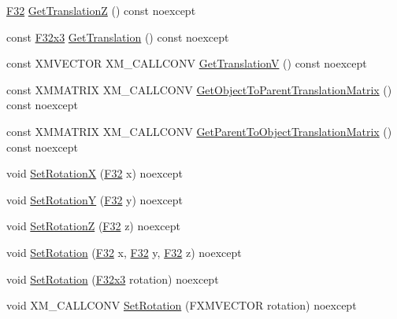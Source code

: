 \begin{DoxyCompactItemize}
\item 
\hyperlink{namespacemage_aa97e833b45f06d60a0a9c4fc22ae02c0}{F32} \hyperlink{classmage_1_1_transform_a2899159e8e953026bf8b6863c65f454f}{Get\+TranslationZ} () const noexcept
\item 
const \hyperlink{namespacemage_a73fbe0da4b8d5bc156bb8453e5b63a17}{F32x3} \hyperlink{classmage_1_1_transform_a2e41df945ad4679a4e0ca021d4f8750b}{Get\+Translation} () const noexcept
\item 
const X\+M\+V\+E\+C\+T\+OR X\+M\+\_\+\+C\+A\+L\+L\+C\+O\+NV \hyperlink{classmage_1_1_transform_a2528e3f6ee97c90966393a8dc365ec05}{Get\+TranslationV} () const noexcept
\item 
const X\+M\+M\+A\+T\+R\+IX X\+M\+\_\+\+C\+A\+L\+L\+C\+O\+NV \hyperlink{classmage_1_1_transform_adfecbcf77681da90a0d22690621936b3}{Get\+Object\+To\+Parent\+Translation\+Matrix} () const noexcept
\item 
const X\+M\+M\+A\+T\+R\+IX X\+M\+\_\+\+C\+A\+L\+L\+C\+O\+NV \hyperlink{classmage_1_1_transform_af59262c0537f9ecb6ab9af0b6dbc70d2}{Get\+Parent\+To\+Object\+Translation\+Matrix} () const noexcept
\item 
void \hyperlink{classmage_1_1_transform_ac626eec777b86b0a1fc946703c962eda}{Set\+RotationX} (\hyperlink{namespacemage_aa97e833b45f06d60a0a9c4fc22ae02c0}{F32} x) noexcept
\item 
void \hyperlink{classmage_1_1_transform_aaf2754a227e2cf416960a92f7e4c5dc7}{Set\+RotationY} (\hyperlink{namespacemage_aa97e833b45f06d60a0a9c4fc22ae02c0}{F32} y) noexcept
\item 
void \hyperlink{classmage_1_1_transform_aca5e1d7c83e91f9c36be98c4a4a2163b}{Set\+RotationZ} (\hyperlink{namespacemage_aa97e833b45f06d60a0a9c4fc22ae02c0}{F32} z) noexcept
\item 
void \hyperlink{classmage_1_1_transform_ad4c49c5298d68f3945698ba88e461145}{Set\+Rotation} (\hyperlink{namespacemage_aa97e833b45f06d60a0a9c4fc22ae02c0}{F32} x, \hyperlink{namespacemage_aa97e833b45f06d60a0a9c4fc22ae02c0}{F32} y, \hyperlink{namespacemage_aa97e833b45f06d60a0a9c4fc22ae02c0}{F32} z) noexcept
\item 
void \hyperlink{classmage_1_1_transform_af89f007948b1572d093e477fd72ca874}{Set\+Rotation} (\hyperlink{namespacemage_a73fbe0da4b8d5bc156bb8453e5b63a17}{F32x3} rotation) noexcept
\item 
void X\+M\+\_\+\+C\+A\+L\+L\+C\+O\+NV \hyperlink{classmage_1_1_transform_a66ddc77bfbbf0b66e00d5ec8e10d1d65}{Set\+Rotation} (F\+X\+M\+V\+E\+C\+T\+OR rotation) noexcept
\item 

\end{DoxyCompactItemize}
